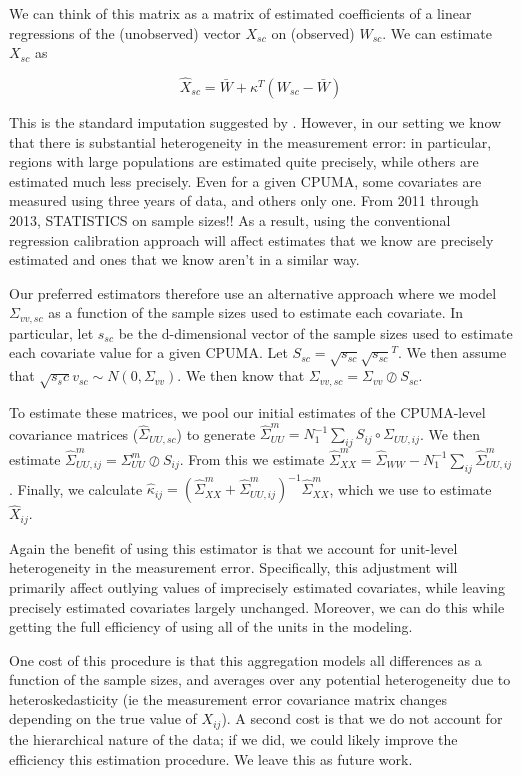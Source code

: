 \documentclass[12pt]{article}
\begin{document}
We can think of this matrix as a matrix of estimated coefficients of a linear regressions of the (unobserved) vector $X_{sc}$ on (observed) $W_{sc}$. We can estimate $X_{sc}$ as

$$
\hat{X}_{sc} = \bar{W} + \kappa^T(W_{sc} - \bar{W})
$$

This is the standard imputation suggested by \cite{carroll2006measurement}. However, in our setting we know that there is substantial heterogeneity in the measurement error: in particular, regions with large populations are estimated quite precisely, while others are estimated much less precisely. Even for a given CPUMA, some covariates are measured using three years of data, and others only one. From 2011 through 2013, STATISTICS on sample sizes!! As a result, using the conventional regression calibration approach will affect estimates that we know are precisely estimated and ones that we know aren't in a similar way. 

Our preferred estimators therefore use an alternative approach where we model $\Sigma_{vv, sc}$ as a function of the sample sizes used to estimate each covariate. In particular, let $s_{sc}$ be the d-dimensional vector of the sample sizes used to estimate each covariate value for a given CPUMA. Let $S_{sc} = \sqrt{s_{sc}}\sqrt{s_{sc}}^T$. We then assume that $\sqrt{s_sc}v_{sc} \sim N(0, \Sigma_{vv})$. We then know that $\Sigma_{vv, sc} = \Sigma_{vv} \oslash S_{sc}$. 

To estimate these matrices, we pool our initial estimates of the CPUMA-level covariance matrices ($\hat{\Sigma}_{UU, sc}$) to generate $\hat{\Sigma}_{UU}^m = N_1^{-1}\sum_{ij} S_{ij} \circ \Sigma_{UU, ij}$. We then estimate $\hat{\Sigma}_{UU, ij}^m = \Sigma_{UU}^m \oslash S_{ij}$. From this we estimate $\hat{\Sigma}^m_{XX} = \hat{\Sigma}_{WW} - N_1^{-1}\sum_{ij}\hat{\Sigma}^m_{UU, ij}$. Finally, we calculate $\hat{\kappa}_{ij} = (\hat{\Sigma}^m_{XX} + \hat{\Sigma}^m_{UU, ij})^{-1}\hat{\Sigma}^m_{XX}$, which we use to estimate $\hat{X}_{ij}$. 

Again the benefit of using this estimator is that we account for unit-level heterogeneity in the measurement error. Specifically, this adjustment will primarily affect outlying values of imprecisely estimated covariates, while leaving precisely estimated covariates largely unchanged. Moreover, we can do this while getting the full efficiency of using all of the units in the modeling. 

One cost of this procedure is that this aggregation models all differences as a function of the sample sizes, and averages over any potential heterogeneity due to heteroskedasticity (ie the measurement error covariance matrix changes depending on the true value of $X_{ij}$). A second cost is that we do not account for the hierarchical nature of the data; if we did, we could likely improve the efficiency this estimation procedure. We leave this as future work.
\end{document}
